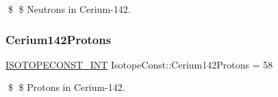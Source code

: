 \$ \$ Neutrons in Cerium-\/142. \mbox{\label{group___isotope_const-_cerium-_ce142_gac351db6ff8cae1f2a9876381a447e7e3}} 
\subsubsection{\texorpdfstring{Cerium142\+Protons}{Cerium142Protons}}
{\footnotesize\ttfamily \mbox{\hyperlink{group___isotope_const-_macros_ga5f18360b3e99483a35c32d789e62621c}{I\+S\+O\+T\+O\+P\+E\+C\+O\+N\+S\+T\+\_\+\+I\+NT}} Isotope\+Const\+::\+Cerium142\+Protons = 58}

\$ \$ Protons in Cerium-\/142. 